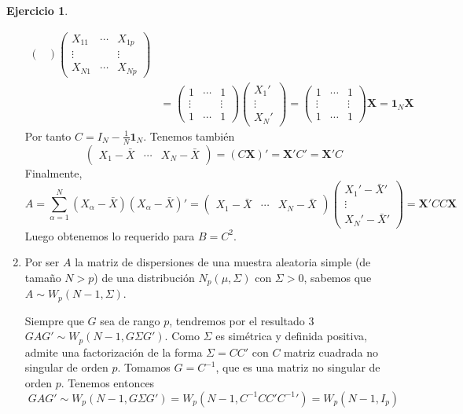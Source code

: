 \documentclass[12pt,spanish]{article}
\theoremstyle{definition}
\newtheorem{exercise}{Ejercicio}
\begin{document}
\begin{exercise}
\begin{enumerate}[$a)$]
\begin{align*}
\begin{pmatrix}
    \end{pmatrix}
    \begin{pmatrix}
      X_{11} & \cdots & X_{1p} \\ \vdots & & \vdots \\ X_{N1} & \cdots & X_{Np}
    \end{pmatrix}\\&=\begin{pmatrix}
      1 & \cdots & 1 \\ \vdots & & \vdots \\ 1 & \cdots & 1
    \end{pmatrix}
    \begin{pmatrix}
      X_1' \\ \vdots \\ X_N'
    \end{pmatrix}=
    \begin{pmatrix}
      1 & \cdots & 1 \\ \vdots & & \vdots \\ 1 & \cdots & 1
    \end{pmatrix}
    \textbf{X}=\textbf{1}_N\textbf{X}
  \end{align*}
  Por tanto $C=I_N-\frac{1}{N}\textbf{1}_N$.
Tenemos también
\[
  \begin{pmatrix}
    X_1-\bar{X} & \cdots & X_N-\bar{X}
  \end{pmatrix}=(C\textbf{X})'=\textbf{X}'C'=\textbf{X}'C
\]
Finalmente,
\[A=\sum_{\alpha=1}^N(X_\alpha-\bar{X})(X_\alpha-\bar{X})'=\begin{pmatrix}
    X_1-\bar{X} & \cdots & X_N-\bar{X}
  \end{pmatrix}\begin{pmatrix}
      X_1'-\bar{X}' \\ \vdots \\ X_N'-\bar{X}'
    \end{pmatrix}=\textbf{X}'CC\textbf{X}\]
  Luego obtenemos lo requerido para $B=C^2$.

\item Por ser $A$ la matriz de dispersiones de una muestra aleatoria
  simple (de tamaño $N>p$) de una distribución $N_p(\mu,\Sigma)$ con
  $\Sigma>0$, sabemos que $A\sim W_p(N-1,\Sigma)$.

  Siempre que $G$ sea de rango $p$, tendremos por el resultado 3
  $GAG'\sim W_p(N-1, G\Sigma G')$. Como $\Sigma$ es simétrica y
  definida positiva, admite una factorización de la forma $\Sigma=CC'$
  con $C$ matriz cuadrada no singular de orden $p$. Tomamos
  $G=C^{-1}$, que es una matriz no singular de orden $p$. Tenemos entonces
  \[GAG'\sim W_p(N-1, G\Sigma G')=W_p(N-1, C^{-1}C C' {C^{-1}}')=W_p(N-1, I_p)\]
\end{enumerate}
\end{exercise}
\end{document}
